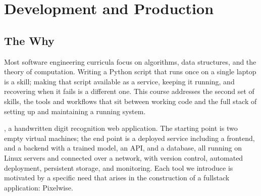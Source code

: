 



\chapter{Development and Production}


\section{The Why}

Most software engineering curricula focus on algorithms, data structures, and the theory of computation.
Writing a Python script that runs once on a single laptop is a skill; making that script available as a service,
keeping it running, and recovering when it fails is a different one.
This course addresses the second set of skills, the tools and workflows
that sit between working code and the full stack of setting up and maintaining a running system. 



,
a handwritten digit recognition web application.
The starting point is two empty virtual machines; the end point is a deployed service including a frontend, 
and a backend with a trained model, an API, 
and a database, all running on Linux servers and connected over a network,
with version control, automated deployment, persistent storage, and monitoring.
Each tool we introduce is motivated by a specific need that arises in the construction of a fullstack application: Pixelwise.

